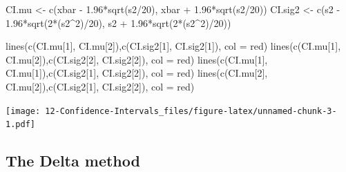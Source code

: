 \documentclass[
]{book}
\newenvironment{Shaded}{\begin{snugshade}}{\end{snugshade}}
\newcommand{\AttributeTok}[1]{\textcolor[rgb]{0.77,0.63,0.00}{#1}}
\newcommand{\DecValTok}[1]{\textcolor[rgb]{0.00,0.00,0.81}{#1}}
\newcommand{\FloatTok}[1]{\textcolor[rgb]{0.00,0.00,0.81}{#1}}
\newcommand{\FunctionTok}[1]{\textcolor[rgb]{0.00,0.00,0.00}{#1}}
\newcommand{\NormalTok}[1]{#1}
\newcommand{\OtherTok}[1]{\textcolor[rgb]{0.56,0.35,0.01}{#1}}
\newcommand{\SpecialCharTok}[1]{\textcolor[rgb]{0.00,0.00,0.00}{#1}}
\newcommand{\StringTok}[1]{\textcolor[rgb]{0.31,0.60,0.02}{#1}}
\begin{document}
\begin{Shaded}
\begin{Highlighting}[]
\NormalTok{CI.mu }\OtherTok{\textless{}{-}} \FunctionTok{c}\NormalTok{(xbar }\SpecialCharTok{{-}} \FloatTok{1.96}\SpecialCharTok{*}\FunctionTok{sqrt}\NormalTok{(s2}\SpecialCharTok{/}\DecValTok{20}\NormalTok{), xbar }\SpecialCharTok{+} \FloatTok{1.96}\SpecialCharTok{*}\FunctionTok{sqrt}\NormalTok{(s2}\SpecialCharTok{/}\DecValTok{20}\NormalTok{))}
\NormalTok{CI.sig2 }\OtherTok{\textless{}{-}} \FunctionTok{c}\NormalTok{(s2 }\SpecialCharTok{{-}} \FloatTok{1.96}\SpecialCharTok{*}\FunctionTok{sqrt}\NormalTok{(}\DecValTok{2}\SpecialCharTok{*}\NormalTok{(s2}\SpecialCharTok{\^{}}\DecValTok{2}\NormalTok{)}\SpecialCharTok{/}\DecValTok{20}\NormalTok{), s2 }\SpecialCharTok{+} \FloatTok{1.96}\SpecialCharTok{*}\FunctionTok{sqrt}\NormalTok{(}\DecValTok{2}\SpecialCharTok{*}\NormalTok{(s2}\SpecialCharTok{\^{}}\DecValTok{2}\NormalTok{)}\SpecialCharTok{/}\DecValTok{20}\NormalTok{))}

\FunctionTok{lines}\NormalTok{(}\FunctionTok{c}\NormalTok{(CI.mu[}\DecValTok{1}\NormalTok{], CI.mu[}\DecValTok{2}\NormalTok{]),}\FunctionTok{c}\NormalTok{(CI.sig2[}\DecValTok{1}\NormalTok{], CI.sig2[}\DecValTok{1}\NormalTok{]), }\AttributeTok{col =} \StringTok{\textquotesingle{}red\textquotesingle{}}\NormalTok{) }
\FunctionTok{lines}\NormalTok{(}\FunctionTok{c}\NormalTok{(CI.mu[}\DecValTok{1}\NormalTok{], CI.mu[}\DecValTok{2}\NormalTok{]),}\FunctionTok{c}\NormalTok{(CI.sig2[}\DecValTok{2}\NormalTok{], CI.sig2[}\DecValTok{2}\NormalTok{]), }\AttributeTok{col =} \StringTok{\textquotesingle{}red\textquotesingle{}}\NormalTok{) }
\FunctionTok{lines}\NormalTok{(}\FunctionTok{c}\NormalTok{(CI.mu[}\DecValTok{1}\NormalTok{], CI.mu[}\DecValTok{1}\NormalTok{]),}\FunctionTok{c}\NormalTok{(CI.sig2[}\DecValTok{1}\NormalTok{], CI.sig2[}\DecValTok{2}\NormalTok{]), }\AttributeTok{col =} \StringTok{\textquotesingle{}red\textquotesingle{}}\NormalTok{) }
\FunctionTok{lines}\NormalTok{(}\FunctionTok{c}\NormalTok{(CI.mu[}\DecValTok{2}\NormalTok{], CI.mu[}\DecValTok{2}\NormalTok{]),}\FunctionTok{c}\NormalTok{(CI.sig2[}\DecValTok{1}\NormalTok{], CI.sig2[}\DecValTok{2}\NormalTok{]), }\AttributeTok{col =} \StringTok{\textquotesingle{}red\textquotesingle{}}\NormalTok{) }
\end{Highlighting}
\end{Shaded}

\texttt{[image: 12-Confidence-Intervals\_files/figure-latex/unnamed-chunk-3-1.pdf]}

\hypertarget{the-delta-method}{%
\subsection{The Delta method}\label{the-delta-method}}
\end{document}
